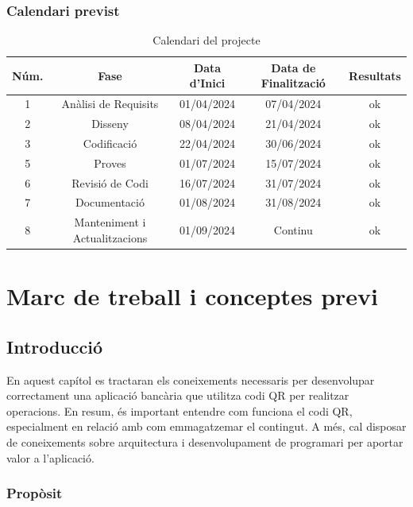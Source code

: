 \documentclass[a4paper,12pt,twoside]{ThesisStyle}
\begin{document}
\subsection{Calendari previst}
\label{subsec: Calendari previst}

\begin{table}[h!]
\centering
\begin{tabular}{|c|c|c|c|c|}
\hline
\textbf{Núm.} & \textbf{Fase} & \textbf{Data d'Inici} & \textbf{Data de Finalització} & \textbf{Resultats}\\
\hline
1 & Anàlisi de Requisits & 01/04/2024 & 07/04/2024 & ok \\
2 & Disseny & 08/04/2024 & 21/04/2024 & ok\\
3 & Codificació & 22/04/2024 & 30/06/2024 & ok\\
5 & Proves & 01/07/2024 & 15/07/2024 & ok\\
6 & Revisió de Codi & 16/07/2024 & 31/07/2024 & ok\\
7 & Documentació & 01/08/2024 & 31/08/2024 & ok\\
8 & Manteniment i Actualitzacions & 01/09/2024 & Continu & ok\\
\hline
\end{tabular}
\caption{Calendari del projecte}
\label{tab:calendari}
\end{table}



\chapter{Marc de treball i conceptes previ}
\label{chp:marcdetreball}


\section{Introducció}
\label{subsec:Introducció}

En aquest capítol es tractaran els coneixements necessaris per desenvolupar correctament una aplicació bancària que utilitza codi QR per realitzar operacions. En resum, és important entendre com funciona el codi QR, especialment en relació amb com emmagatzemar el contingut. A més, cal disposar de coneixements sobre arquitectura i desenvolupament de programari per aportar valor a l'aplicació.

\subsection{Propòsit}
\label{subsec: Propòsit}
\end{document}
